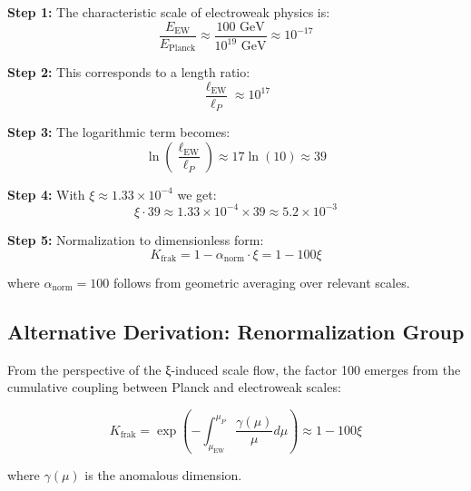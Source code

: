 	\begin{tcolorbox}[colback=yellow!5!white,colframe=orange!75!black,title={Derivation of the Factor 100}]
		\textbf{Step 1:} The characteristic scale of electroweak physics is:
		\begin{equation}
			\frac{E_{\text{EW}}}{E_{\text{Planck}}} \approx \frac{100 \text{ GeV}}{10^{19} \text{ GeV}} \approx 10^{-17}
		\end{equation}
		
		\textbf{Step 2:} This corresponds to a length ratio:
		\begin{equation}
			\frac{\ell_{\text{EW}}}{\ell_P} \approx 10^{17}
		\end{equation}
		
		\textbf{Step 3:} The logarithmic term becomes:
		\begin{equation}
			\ln\left(\frac{\ell_{\text{EW}}}{\ell_P}\right) \approx 17 \ln(10) \approx 39
		\end{equation}
		
		\textbf{Step 4:} With $\xi \approx 1.33 \times 10^{-4}$ we get:
		\begin{equation}
			\xi \cdot 39 \approx 1.33 \times 10^{-4} \times 39 \approx 5.2 \times 10^{-3}
		\end{equation}
		
		\textbf{Step 5:} Normalization to dimensionless form:
		\begin{equation}
			K_{\text{frak}} = 1 - \alpha_{\text{norm}} \cdot \xi = 1 - 100\xi
		\end{equation}
		
		where $\alpha_{\text{norm}} = 100$ follows from geometric averaging over relevant scales.
	\end{tcolorbox}
	
	\subsection{Alternative Derivation: Renormalization Group}
	
	From the perspective of the ξ-induced scale flow, the factor 100 emerges from the cumulative coupling between Planck and electroweak scales:
	
	\begin{equation}
		K_{\text{frak}} = \exp\left(-\int_{\mu_{\text{EW}}}^{\mu_P} \frac{\gamma(\mu)}{\mu} d\mu\right) \approx 1 - 100\xi
	\end{equation}
	
	where $\gamma(\mu)$ is the anomalous dimension.
	
